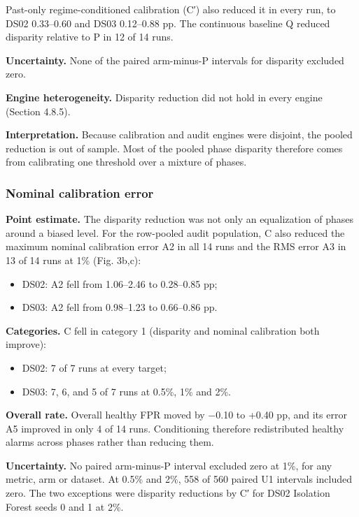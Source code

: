 \documentclass[preprint,11pt,a4paper]{elsarticle}
\begin{document}
Past-only regime-conditioned calibration (C′) also reduced it in every run, to DS02 0.33–0.60 and DS03 0.12–0.88 pp. The continuous baseline Q reduced disparity relative to P in 12 of 14 runs.

\textbf{Uncertainty.} None of the paired arm-minus-P intervals for disparity excluded zero.

\textbf{Engine heterogeneity.} Disparity reduction did not hold in every engine (Section 4.8.5).

\textbf{Interpretation.} Because calibration and audit engines were disjoint, the pooled reduction is out of sample. Most of the pooled phase disparity therefore comes from calibrating one threshold over a mixture of phases.

\subsubsection{Nominal calibration error}

\textbf{Point estimate.} The disparity reduction was not only an equalization of phases around a biased level. For the row-pooled audit population, C also reduced the maximum nominal calibration error A2 in all 14 runs and the RMS error A3 in 13 of 14 runs at 1\% (Fig. 3b,c):
\begin{itemize}
\item DS02: A2 fell from 1.06–2.46 to 0.28–0.85 pp;
\item DS03: A2 fell from 0.98–1.23 to 0.66–0.86 pp.
\end{itemize}

\textbf{Categories.} C fell in category 1 (disparity and nominal calibration both improve):
\begin{itemize}
\item DS02: 7 of 7 runs at every target;
\item DS03: 7, 6, and 5 of 7 runs at 0.5\%, 1\% and 2\%.
\end{itemize}

\textbf{Overall rate.} Overall healthy FPR moved by −0.10 to +0.40 pp, and its error A5 improved in only 4 of 14 runs. Conditioning therefore redistributed healthy alarms across phases rather than reducing them.

\textbf{Uncertainty.} No paired arm-minus-P interval excluded zero at 1\%, for any metric, arm or dataset. At 0.5\% and 2\%, 558 of 560 paired U1 intervals included zero. The two exceptions were disparity reductions by C′ for DS02 Isolation Forest seeds 0 and 1 at 2\%.
\end{document}
